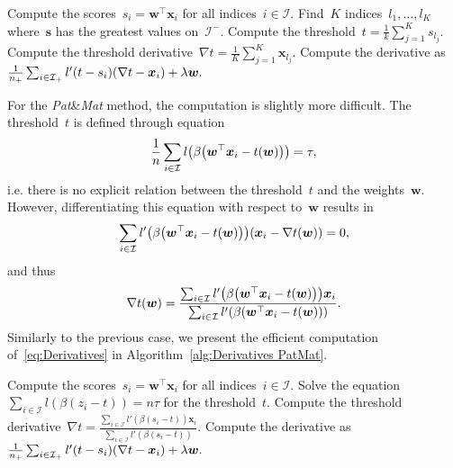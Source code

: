 \documentclass[11pt,a4paper]{article}
\theoremstyle{definition}
\let\originalleft\left
\let\originalright\right
\renewcommand{\left}{\mathopen{}\mathclose\bgroup\originalleft}
\renewcommand{\right}{\aftergroup\egroup\originalright}
\newcommand{\I}{\mathcal{I}}
\newcommand{\toppushk}{\textit{TopPush$K$}\xspace}
\newcommand{\patmat}{\textit{Pat}\textup{\&}\textit{Mat}\xspace}
\begin{document}
\begin{algorithm}[!ht]
  \begin{algorithmic}[1]
    \State Compute the scores~$s_i = \bm{w}^\top \bm{x}_i$ for all indices~$i \in \I.$
    \State Find~$K$ indices~$l_1,\dots,l_K$ where~$\bm{s}$ has the greatest values on~$\I^-.$
    \State Compute the threshold~$t = \frac{1}{k}\sum_{j=1}^K s_{l_j}.$
    \State Compute the threshold derivative~$\nabla t = \frac{1}{K}\sum_{j=1}^K \bm{x}_{l_j}.$
    \State Compute the derivative as~$\frac{1}{n_+}\sum_{i \in \I_+}l'\left( t- s_i\right) \left( \nabla t - \bm{x}_i\right)+\lambda\bm{w}.$
  \end{algorithmic}
  \caption{Efficient computation of~\eqref{eq:Derivatives} for \toppushk.}
  \label{alg:Derivatives TopPushK}
\end{algorithm}

For the \patmat method, the computation is slightly more difficult. The threshold~$t$ is defined through equation
\begin{equation*}
  \frac{1}{n}\sum_{i \in \I} l\left( \beta \left( \bm{w}^\top \bm{x}_i - t(\bm{w}) \right) \right) = \tau,
\end{equation*}
i.e. there is no explicit relation between the threshold~$t$ and the weights~$\bm{w}.$ However, differentiating this equation with respect to~$\bm{w}$ results in
\begin{equation*}
  \sum_{i \in \I} l'\left( \beta \left( \bm{w}^\top \bm{x}_i - t(\bm{w}) \right) \right)\left(\bm{x}_i - \nabla t(\bm{w}) \right) = 0,
\end{equation*}
and thus
\begin{equation*}
  \nabla t(\bm{w}) = \frac{\sum_{i \in \I} l'\left( \beta \left( \bm{w}^\top \bm{x}_i - t(\bm{w}) \right) \right)\bm{x}_i}{\sum_{i \in \I} l'\left( \beta \left( \bm{w}^\top \bm{x}_i - t(\bm{w}) \right) \right)}.
\end{equation*}
Similarly to the previous case, we present the efficient computation of~\eqref{eq:Derivatives} in Algorithm~\ref{alg:Derivatives PatMat}.

\begin{algorithm}[!ht]
  \begin{algorithmic}[1]
    \State Compute the scores~$s_i = \bm{w}^\top \bm{x}_i$ for all indices~$i \in \I.$
    \State Solve the equation~$\sum_{i \in \I}l(\beta(z_i-t))=n\tau$ for the threshold~$t.$
    \State Compute the threshold derivative~$\nabla t = \frac{\sum_{i\in \I}l'(\beta(s_i - t))\bm{x}_i}{\sum_{i \in \I}l'(\beta(s_i-t))}.$
    \State Compute the derivative as~$\frac{1}{n_+}\sum_{i \in \I_+}l'\left( t- s_i\right) \left( \nabla t - \bm{x}_i \right) + \lambda \bm{w}.$
  \end{algorithmic}
  \caption{Efficient computation of~\eqref{eq:Derivatives} for \patmat.}
  \label{alg:Derivatives PatMat}
\end{algorithm}
\end{document}
